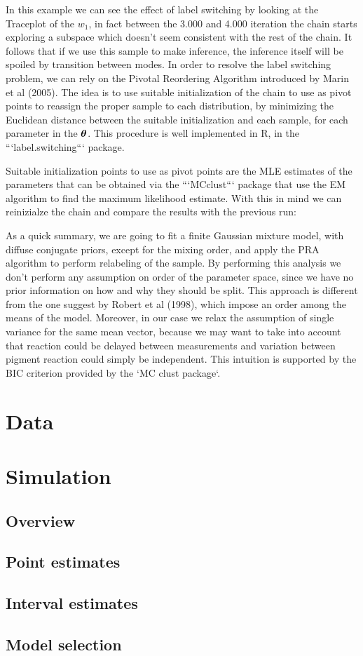 \documentclass{article}
\begin{document}
In this example we can see the effect of label switching by looking at the Traceplot of the $w_1$, in fact between the 3.000 and 4.000 iteration the chain starts exploring a subspace which doesn't seem consistent with the rest of the chain. It follows that if we use this sample to make inference, the inference itself will be spoiled by transition between modes. In order to resolve the label switching problem, we can rely on the Pivotal Reordering Algorithm introduced by Marin et al (2005). The idea is to use suitable initialization of the chain to use as pivot points to reassign the proper sample to each distribution, by minimizing the Euclidean distance between the suitable initialization and each sample, for each parameter in the $\boldsymbol{\theta}$. This procedure is well implemented in R, in the ```label.switching``` package. 

Suitable initialization points to use as pivot points are the MLE estimates of the parameters that can be obtained via the ```MCclust``` package that use the EM algorithm to find the maximum likelihood estimate. With this in mind we can reinizialze the chain and compare the results with the previous run:


As a quick summary, we are going to fit a finite Gaussian mixture model, with diffuse conjugate priors, except for the mixing order, and apply the PRA algorithm to perform relabeling of the sample. By performing this analysis we don't perform any assumption on order of the parameter space, since we have no prior information on how and why they should be split. This approach is different from the one suggest by Robert et al (1998), which impose an order among the means of the model. Moreover, in our case we relax the assumption of single variance for the same mean vector, because we may want to take into account that reaction could be delayed between measurements and variation between pigment reaction could simply be independent. %
This intuition is supported by the BIC criterion provided by the `MC clust package`. %


\section{Data}
 


\section{Simulation}
\subsection{Overview}
\subsection{Point estimates}
\subsection{Interval estimates}
\subsection{Model selection}
\end{document}
